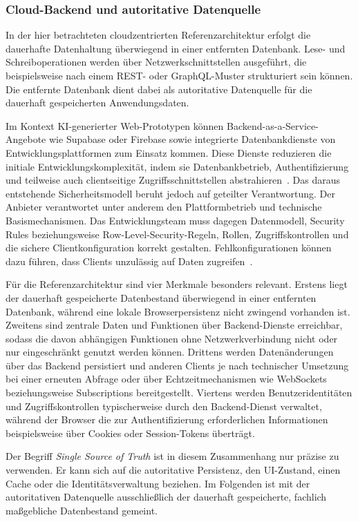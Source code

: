 \subsubsection{Cloud-Backend und autoritative Datenquelle}
In der hier betrachteten cloudzentrierten Referenzarchitektur erfolgt die dauerhafte Datenhaltung überwiegend in einer entfernten Datenbank.
Lese- und Schreiboperationen werden über Netzwerkschnittstellen ausgeführt, die beispielsweise nach einem REST- oder GraphQL-Muster strukturiert sein können.
Die entfernte Datenbank dient dabei als autoritative Datenquelle für die dauerhaft gespeicherten Anwendungsdaten.

Im Kontext KI-generierter Web-Prototypen können Backend-as-a-Service-Angebote wie Supabase oder Firebase sowie integrierte Datenbankdienste von Entwicklungsplattformen zum Einsatz kommen.
Diese Dienste reduzieren die initiale Entwicklungskomplexität, indem sie Datenbankbetrieb, Authentifizierung und teilweise auch clientseitige Zugriffsschnittstellen abstrahieren~\cite{lovable2026docs}.
Das daraus entstehende Sicherheitsmodell beruht jedoch auf geteilter Verantwortung.
Der Anbieter verantwortet unter anderem den Plattformbetrieb und technische Basismechanismen.
Das Entwicklungsteam muss dagegen Datenmodell, Security Rules beziehungsweise Row-Level-Security-Regeln, Rollen, Zugriffskontrollen und die sichere Clientkonfiguration korrekt gestalten.
Fehlkonfigurationen können dazu führen, dass Clients unzulässig auf Daten zugreifen~\cite{albergotti2025lovable}.

Für die Referenzarchitektur sind vier Merkmale besonders relevant.
Erstens liegt der dauerhaft gespeicherte Datenbestand überwiegend in einer entfernten Datenbank, während eine lokale Browserpersistenz nicht zwingend vorhanden ist.
Zweitens sind zentrale Daten und Funktionen über Backend-Dienste erreichbar, sodass die davon abhängigen Funktionen ohne Netzwerkverbindung nicht oder nur eingeschränkt genutzt werden können.
Drittens werden Datenänderungen über das Backend persistiert und anderen Clients je nach technischer Umsetzung bei einer erneuten Abfrage oder über Echtzeitmechanismen wie WebSockets beziehungsweise Subscriptions bereitgestellt.
Viertens werden Benutzeridentitäten und Zugriffskontrollen typischerweise durch den Backend-Dienst verwaltet, während der Browser die zur Authentifizierung erforderlichen Informationen beispielsweise über Cookies oder Session-Tokens überträgt.

Der Begriff \emph{Single Source of Truth} ist in diesem Zusammenhang nur präzise zu verwenden.
Er kann sich auf die autoritative Persistenz, den UI-Zustand, einen Cache oder die Identitätsverwaltung beziehen.
Im Folgenden ist mit der autoritativen Datenquelle ausschließlich der dauerhaft gespeicherte, fachlich maßgebliche Datenbestand gemeint.


